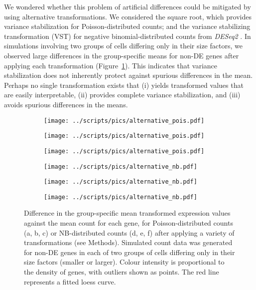 \documentclass[10pt,letterpaper]{article}
\begin{document}
We wondered whether this problem of artificial differences could be mitigated by using alternative transformations.
We considered the square root, which provides variance stabilization for Poisson-distributed counts;
and the variance stabilizing transformation (VST) for negative binomial-distributed counts from \emph{DESeq2} \cite{love2014moderated}.
In simulations involving two groups of cells differing only in their size factors, we observed large differences in the group-specific means for non-DE genes after applying each transformation (Figure~\ref{fig:alttransform}).
This indicates that variance stabilization does not inherently protect against spurious differences in the mean.
Perhaps no single transformation exists that 
(i) yields transformed values that are easily interpretable,
(ii) provides complete variance stabilization, and
(iii) avoids spurious differences in the means.

\begin{figure}
\centering
\begin{subfigure}[b]{0.32\textwidth}
    \texttt{[image: ../scripts/pics/alternative\_pois.pdf]}
    \caption{}
\end{subfigure}
\begin{subfigure}[b]{0.32\textwidth}
    \texttt{[image: ../scripts/pics/alternative\_pois.pdf]}
    \caption{}
\end{subfigure}
\begin{subfigure}[b]{0.32\textwidth}
    \texttt{[image: ../scripts/pics/alternative\_pois.pdf]}
    \caption{}
\end{subfigure}
\begin{subfigure}[b]{0.32\textwidth}
    \texttt{[image: ../scripts/pics/alternative\_nb.pdf]}
    \caption{}
\end{subfigure}
\begin{subfigure}[b]{0.32\textwidth}
   \texttt{[image: ../scripts/pics/alternative\_nb.pdf]}
    \caption{}
\end{subfigure}
\begin{subfigure}[b]{0.32\textwidth}
   \texttt{[image: ../scripts/pics/alternative\_nb.pdf]}
    \caption{}
\end{subfigure}
\caption{Difference in the group-specific mean transformed expression values against the mean count for each gene, 
for Poisson-distributed counts (a, b, c) or NB-distributed counts (d, e, f) after applying a variety of transformations (see Methods).
Simulated count data was generated for non-DE genes in each of two groups of cells differing only in their size factors (smaller or larger).
Colour intensity is proportional to the density of genes, with outliers shown as points.
The red line represents a fitted loess curve.
}
\label{fig:alttransform}
\end{figure}
\end{document}

